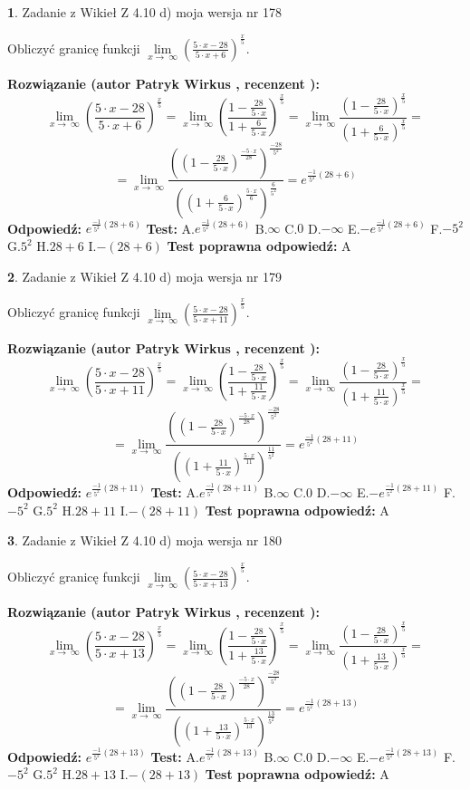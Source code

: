 \documentclass[12pt, a4paper]{article}
\theoremstyle{definition} %
\newtheorem{zad}{}
\newcommand{\zadStart}[1]{\begin{zad}#1\newline}
\newcommand{\zadStop}{\end{zad}}
\newcommand{\rozwStart}[2]{\noindent \textbf{Rozwiązanie (autor #1 , recenzent #2): }\newline}
\newcommand{\rozwStop}{\newline}
\newcommand{\odpStart}{\noindent \textbf{Odpowiedź:}\newline}
\newcommand{\odpStop}{\newline}
\newcommand{\testStart}{\noindent \textbf{Test:}\newline}
\newcommand{\testStop}{\newline}
\newcommand{\kluczStart}{\noindent \textbf{Test poprawna odpowiedź:}\newline}
\newcommand{\kluczStop}{\newline}
\begin{document}
\zadStart{Zadanie z Wikieł Z 4.10 d) moja wersja nr 178}


Obliczyć granicę funkcji  $\lim\limits_{x\to\ \infty}(\frac{5\cdot x-28}{5\cdot x+6})^{\frac{x}{5}}$.
\zadStop
\rozwStart{Patryk Wirkus}{}
$$\lim\limits_{x\to\ \infty}(\frac{5\cdot x-28}{5\cdot x+6})^{\frac{x}{5}} = \lim\limits_{x\to\ \infty}(\frac{1-\frac{28}{5\cdot x}}{1+\frac{6}{5\cdot x}})^{\frac{x}{5}}=\lim\limits_{x\to\ \infty}\frac{(1-\frac{28}{5\cdot x})^{\frac{x}{5}}}{(1+\frac{6}{5\cdot x})^{\frac{x}{5}}}=$$
$$=\lim\limits_{x\to\ \infty}\frac{((1-\frac{28}{5\cdot x})^{\frac{-5\cdot x}{28}})^{\frac{-28}{5^{2}}}}{((1+\frac{6}{5\cdot x})^{\frac{5\cdot x}{6}})^{\frac{6}{5^{2}}}}=e^{\frac{-1}{5^{2}}(28+6)}$$
\rozwStop
\odpStart
$e^{\frac{-1}{5^{2}}(28+6)}$
\odpStop
\testStart
A.$e^{\frac{-1}{5^{2}}(28+6)}$ B.$\infty$ C.$0$ D.$-\infty$ E.$-e^{\frac{-1}{5^{2}}(28+6)}$
F.$-5^{2}$ G.$5^{2}$
H.$28+6$
I.$-(28+6)$
\testStop
\kluczStart
A
\kluczStop



\zadStart{Zadanie z Wikieł Z 4.10 d) moja wersja nr 179}


Obliczyć granicę funkcji  $\lim\limits_{x\to\ \infty}(\frac{5\cdot x-28}{5\cdot x+11})^{\frac{x}{5}}$.
\zadStop
\rozwStart{Patryk Wirkus}{}
$$\lim\limits_{x\to\ \infty}(\frac{5\cdot x-28}{5\cdot x+11})^{\frac{x}{5}} = \lim\limits_{x\to\ \infty}(\frac{1-\frac{28}{5\cdot x}}{1+\frac{11}{5\cdot x}})^{\frac{x}{5}}=\lim\limits_{x\to\ \infty}\frac{(1-\frac{28}{5\cdot x})^{\frac{x}{5}}}{(1+\frac{11}{5\cdot x})^{\frac{x}{5}}}=$$
$$=\lim\limits_{x\to\ \infty}\frac{((1-\frac{28}{5\cdot x})^{\frac{-5\cdot x}{28}})^{\frac{-28}{5^{2}}}}{((1+\frac{11}{5\cdot x})^{\frac{5\cdot x}{11}})^{\frac{11}{5^{2}}}}=e^{\frac{-1}{5^{2}}(28+11)}$$
\rozwStop
\odpStart
$e^{\frac{-1}{5^{2}}(28+11)}$
\odpStop
\testStart
A.$e^{\frac{-1}{5^{2}}(28+11)}$ B.$\infty$ C.$0$ D.$-\infty$ E.$-e^{\frac{-1}{5^{2}}(28+11)}$
F.$-5^{2}$ G.$5^{2}$
H.$28+11$
I.$-(28+11)$
\testStop
\kluczStart
A
\kluczStop



\zadStart{Zadanie z Wikieł Z 4.10 d) moja wersja nr 180}


Obliczyć granicę funkcji  $\lim\limits_{x\to\ \infty}(\frac{5\cdot x-28}{5\cdot x+13})^{\frac{x}{5}}$.
\zadStop
\rozwStart{Patryk Wirkus}{}
$$\lim\limits_{x\to\ \infty}(\frac{5\cdot x-28}{5\cdot x+13})^{\frac{x}{5}} = \lim\limits_{x\to\ \infty}(\frac{1-\frac{28}{5\cdot x}}{1+\frac{13}{5\cdot x}})^{\frac{x}{5}}=\lim\limits_{x\to\ \infty}\frac{(1-\frac{28}{5\cdot x})^{\frac{x}{5}}}{(1+\frac{13}{5\cdot x})^{\frac{x}{5}}}=$$
$$=\lim\limits_{x\to\ \infty}\frac{((1-\frac{28}{5\cdot x})^{\frac{-5\cdot x}{28}})^{\frac{-28}{5^{2}}}}{((1+\frac{13}{5\cdot x})^{\frac{5\cdot x}{13}})^{\frac{13}{5^{2}}}}=e^{\frac{-1}{5^{2}}(28+13)}$$
\rozwStop
\odpStart
$e^{\frac{-1}{5^{2}}(28+13)}$
\odpStop
\testStart
A.$e^{\frac{-1}{5^{2}}(28+13)}$ B.$\infty$ C.$0$ D.$-\infty$ E.$-e^{\frac{-1}{5^{2}}(28+13)}$
F.$-5^{2}$ G.$5^{2}$
H.$28+13$
I.$-(28+13)$
\testStop
\kluczStart
A
\kluczStop
\end{document}
